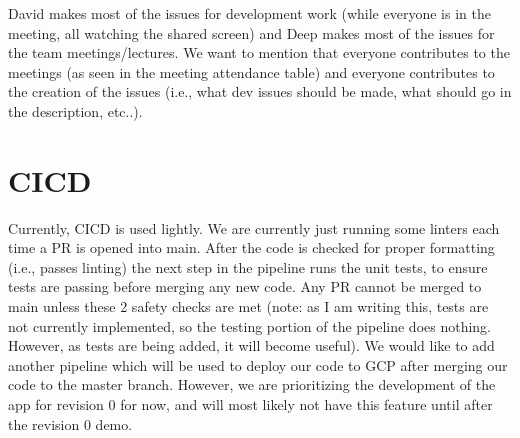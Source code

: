 \documentclass{article}
\begin{document}
David makes most of the issues for development work (while everyone is in the meeting, all watching the shared screen) and Deep makes
most of the issues for the team meetings/lectures. We want to mention that everyone contributes to the meetings (as seen in the meeting 
attendance table) and everyone contributes to the creation of the issues (i.e., what dev issues should be made, what should go in the 
description, etc..).

\section{CICD}

Currently, CICD is used lightly. We are currently just running some linters each time a PR is opened into main. After the code is checked
for proper formatting (i.e., passes linting) the next step in the pipeline runs the unit tests, to ensure tests are passing before merging
any new code. Any PR cannot be merged to main unless these 2 safety checks are met (note: as I am writing this, tests are not currently implemented,
so the testing portion of the pipeline does nothing. However, as tests are being added, it will become useful). We would like to add another 
pipeline which will be used to deploy our code to GCP after merging our code to the master branch. However, we are prioritizing the development
of the app for revision 0 for now, and will most likely not have this feature until after the revision 0 demo.
\end{document}

